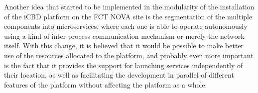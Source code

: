 Another idea that started to be implemented in the modularity of the installation of the iCBD platform on the FCT NOVA site is the segmentation of the multiple components into microservices, where each one is able to operate autonomously using a kind of inter-process communication mechanism or merely the network itself. With this change, it is believed that it would be possible to make better use of the resources allocated to the platform, and probably even more important is the fact that it provides the support for launching services independently of their location, as well as facilitating the development in parallel of different features of the platform without affecting the platform as a whole.





